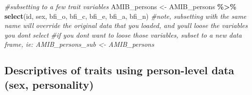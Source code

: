 \documentclass[
]{book}
\newenvironment{Shaded}{\begin{snugshade}}{\end{snugshade}}
\newcommand{\CommentTok}[1]{\textcolor[rgb]{0.56,0.35,0.01}{\textit{#1}}}
\newcommand{\FunctionTok}[1]{\textcolor[rgb]{0.13,0.29,0.53}{\textbf{#1}}}
\newcommand{\NormalTok}[1]{#1}
\newcommand{\OtherTok}[1]{\textcolor[rgb]{0.56,0.35,0.01}{#1}}
\newcommand{\SpecialCharTok}[1]{\textcolor[rgb]{0.81,0.36,0.00}{\textbf{#1}}}
\theoremstyle{definition}
\theoremstyle{definition}
\theoremstyle{definition}
\theoremstyle{definition}
\theoremstyle{remark}
\begin{document}
\begin{Shaded}
\begin{Highlighting}[]
\CommentTok{\#subsetting to a few trait variables}
\NormalTok{AMIB\_persons }\OtherTok{\textless{}{-}}\NormalTok{ AMIB\_persons }\SpecialCharTok{\%\textgreater{}\%}
  \FunctionTok{select}\NormalTok{(id, sex, bfi\_o, bfi\_c, bfi\_e, bfi\_a, bfi\_n)}
\CommentTok{\#note, subsetting with the same name will override the original data that you loaded, and you\textquotesingle{}ll loose the variables you don\textquotesingle{}t select}
\CommentTok{\#if you don\textquotesingle{}t want to loose those variables, subset to a new data frame, ie: AMIB\_persons\_sub \textless{}{-} AMIB\_persons}
\end{Highlighting}
\end{Shaded}

\subsection{Descriptives of traits using person-level data (sex, personality)}\label{descriptives-of-traits-using-person-level-data-sex-personality}
\end{document}
